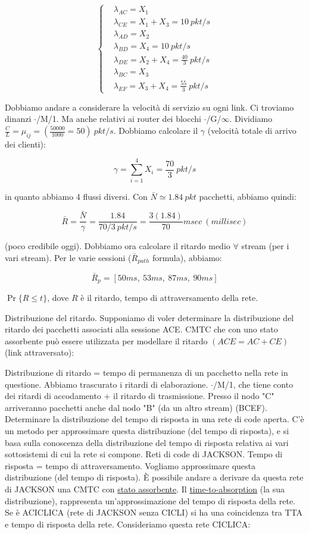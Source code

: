 \[
	\left\{
	\begin{aligned}
	&\lambda_{AC}=X_1\\
	&\lambda_{CE}=X_1+X_3=10\ pkt/s\\
	&\lambda_{AD}=X_2\\
	&\lambda_{BD}=X_4=10\ pkt/s\\
	&\lambda_{DE}=X_2+X_4=\frac{40}{3}\ pkt/s\\
	&\lambda_{BC}=X_3\\
	&\lambda_{EF}=X_3+X_4=\frac{55}{3}\ pkt/s
	\end{aligned}
	\right.
\]

Dobbiamo andare a considerare la velocità di servizio su ogni link. Ci troviamo dinanzi $\mathord{\cdot}$/M/1. Ma anche relativi ai router dei blocchi $\mathord{\cdot}$/G/$\infty$. Dividiamo $\frac{C}{\mathit{L}}=\mu_{ij}=(\frac{50000}{1000}=50)\ pkt/s$. Dobbiamo calcolare il $\gamma$ (velocità totale di arrivo dei clienti):

\[
	\gamma=\sum_{i=1}^4{X_i}=\frac{70}{3}\ pkt/s
\]

in quanto abbiamo 4 flussi diversi. Con $\bar{N} \simeq 1.84\ pkt$ pacchetti, abbiamo quindi:

\[
	\bar{R}=\frac{\bar{N}}{\gamma}=\frac{1.84}{70/3\ pkt/s} = \frac{3(1.84)}{70} msec\ (millisec)
\]

(poco credibile oggi). Dobbiamo ora calcolare il ritardo medio $\forall$ stream (per i vari stream). Per le varie sessioni ($\bar{R}_{path}$ formula), abbiamo:

\[
	\bar{R}_p=[50ms,\ 53ms,\ 87ms,\ 90ms]
\]

$\Pr\{R\leq t\}$, dove $R$ è il ritardo, tempo di attraversamento della rete.

Distribuzione del ritardo. Supponiamo di voler determinare la distribuzione del ritardo dei pacchetti associati alla sessione ACE. CMTC che con uno stato assorbente può essere utilizzata per modellare il ritardo $(ACE=AC+CE)$ (link attraversato):



Distribuzione di ritardo = tempo di permanenza di un pacchetto nella rete in questione. Abbiamo trascurato i ritardi di elaborazione. $\mathord{\cdot}$/M/1, che tiene conto dei ritardi di accodamento + il ritardo di trasmissione. Presso il nodo "C" arriveranno pacchetti anche dal nodo "B" (da un altro stream) (BCEF). Determinare la distribuzione del tempo di risposta in una rete di code aperta. C'è un metodo per approssimare questa distribuzione (del tempo di risposta), e si basa sulla conoscenza della distribuzione del tempo di risposta relativa ai vari sottosistemi di cui la rete si compone. Reti di code di JACKSON. Tempo di risposta = tempo di attraversamento. Vogliamo approssimare questa distribuzione (del tempo di risposta). \`E possibile andare a derivare da questa rete di JACKSON una CMTC con \underline{stato assorbente}. Il \underline{time-to-absorption} (la sua distribuzione), rappresenta un'approssimazione del tempo di risposta della rete. Se è ACICLICA (rete di JACKSON senza CICLI) si ha una coincidenza tra TTA e tempo di risposta della rete.
Consideriamo questa rete CICLICA:

